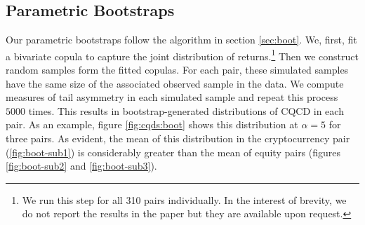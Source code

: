 \documentclass{article}
\begin{document}
\subsection{Parametric Bootstraps}
Our parametric bootstraps follow the algorithm in section \ref{sec:boot}. We, first, fit a bivariate copula to capture the joint distribution of returns.\footnote{We run this step for all 310 pairs individually. In the interest of brevity, we do not report the results in the paper but they are available upon request.} Then we construct random samples form the fitted copulas. For each pair, these simulated samples have the same size of the associated observed sample in the data. We compute measures of tail asymmetry in each simulated sample and repeat this process $5000$ times. This results in bootstrap-generated distributions of CQCD in each pair. As an example, figure \ref{fig:cqds:boot} shows this distribution at $\alpha = 5$ for three pairs. As evident, the mean of this distribution in the cryptocurrency pair (\ref{fig:boot-sub1}) is considerably greater than the mean of equity pairs (figures \ref{fig:boot-sub2} and \ref{fig:boot-sub3}). 
\end{document}
